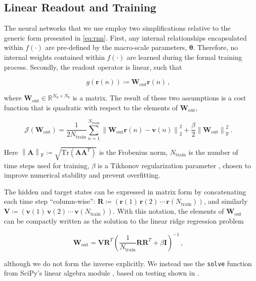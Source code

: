 \documentclass[draft]{agujournal2019}
\newcommand{\state}{\mathbf{v}}
\newcommand{\State}{\mathbf{V}}
\newcommand{\hidden}{\mathbf{r}}
\newcommand{\Hidden}{\mathbf{R}}
\newcommand{\hiddenlayer}{f}
\newcommand{\outputlayer}{g}
\newcommand{\hyperparameters}{\bm{\theta}}
\newcommand{\Wout}{\mathbf{W}_\text{out}}
\newcommand{\cf}{\mathcal{J}}
\newcommand{\tikhonov}{\beta}
\newcommand{\nstate}{N_{\state}}
\newcommand{\nhidden}{N_{\hidden}}
\newcommand{\ntrain}{N_\text{train}}
\newcommand{\Woutspace}{\mathbb{R}^{\nstate\times\nhidden}}
\newcommand{\norm}[1]{\left\lVert#1\right\rVert}
\newcommand{\citep}{\cite}
\newcommand{\citet}{\citeA}
\begin{document}
\subsection{Linear Readout and Training}
\label{subsec:readout}

The neural networks that we use employ two
simplifications relative to the generic form presented in
\cref{eq:rnn}.
First, any internal relationships encapsulated within
$\hiddenlayer(\cdot)$ are pre-defined by the macro-scale parameters,
$\hyperparameters$.
Therefore, no internal weights contained within $\hiddenlayer(\cdot)$
are learned during the formal training process.
Secondly, the readout operator is linear, such that
\begin{linenomath*}\begin{equation*}
    \outputlayer(\hidden(n)) \coloneqq \Wout \hidden(n) \, ,
\end{equation*}\end{linenomath*}
where $\Wout \in \Woutspace$ is a matrix.
The result of these two assumptions is a cost function that is quadratic with
respect to the elements of $\Wout$,
\begin{linenomath*}\begin{equation}
    \cf(\Wout) =
        \dfrac{1}{2\ntrain}\sum_{n=1}^{\ntrain}
        \norm{\Wout \hidden(n) - \state(n)}^2_2
        +
        \dfrac{\tikhonov}{2}\norm{\Wout}_\text{F}^2 \, .
    \label{eq:cost}
\end{equation}\end{linenomath*}
Here
$\norm{\mathbf{A}}_\text{F} \coloneqq
\sqrt{\text{Tr}\left(\mathbf{A}\mathbf{A}^T\right)}$
is the Frobenius norm,
$\ntrain$ is the number of time steps used for training,
$\tikhonov$ is a Tikhonov regularization parameter \citep{tikhonov_solution_1963}, chosen to improve
numerical stability and prevent overfitting.

The hidden and target states can be expressed in matrix form by concatenating
each time step ``column-wise'':
$\Hidden \coloneqq (\hidden(1) \, \hidden(2) \, \cdots \, \hidden(\ntrain))$,
and similarly\\
\noindent$\State \coloneqq (\state(1) \, \state(2) \, \cdots \, \state(\ntrain))$.
With this notation, the elements of $\Wout$ can be compactly written as the
solution to the linear ridge regression problem
\begin{linenomath*}\begin{equation}
    \Wout = \State \Hidden^T \left(\dfrac{1}{\ntrain}\Hidden\Hidden^T +
    \tikhonov\mathbf{I}\right)^{-1} \, ,
    \label{eq:ridge_regression}
\end{equation}\end{linenomath*}
although we do not form the inverse explicitly.
We instead use the \texttt{solve} function from SciPy's linear algebra module
\citep{scipy_2020}, based on testing shown in
\citet<Appendix C of>[]{platt_systematic_2022}.
\end{document}
